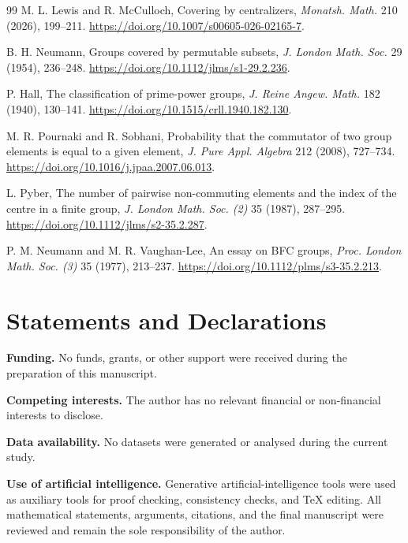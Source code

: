 \documentclass[11pt]{article}
\theoremstyle{definition}
\theoremstyle{remark}
\begin{document}
\begin{thebibliography}{99}
M. L. Lewis and R. McCulloch, Covering by centralizers, \emph{Monatsh. Math.} 210 (2026), 199--211. \url{https://doi.org/10.1007/s00605-026-02165-7}.

B. H. Neumann, Groups covered by permutable subsets, \emph{J. London Math. Soc.} 29 (1954), 236--248. \url{https://doi.org/10.1112/jlms/s1-29.2.236}.

P. Hall, The classification of prime-power groups, \emph{J. Reine Angew. Math.} 182 (1940), 130--141. \url{https://doi.org/10.1515/crll.1940.182.130}.

M. R. Pournaki and R. Sobhani, Probability that the commutator of two group elements is equal to a given element, \emph{J. Pure Appl. Algebra} 212 (2008), 727--734. \url{https://doi.org/10.1016/j.jpaa.2007.06.013}.

L. Pyber, The number of pairwise non-commuting elements and the index of the centre in a finite group, \emph{J. London Math. Soc. (2)} 35 (1987), 287--295. \url{https://doi.org/10.1112/jlms/s2-35.2.287}.

P. M. Neumann and M. R. Vaughan-Lee, An essay on BFC groups, \emph{Proc. London Math. Soc. (3)} 35 (1977), 213--237. \url{https://doi.org/10.1112/plms/s3-35.2.213}.

\end{thebibliography}

\section*{Statements and Declarations}

\noindent\textbf{Funding.} No funds, grants, or other support were received during the preparation of this manuscript.

\medskip
\noindent\textbf{Competing interests.} The author has no relevant financial or non-financial interests to disclose.

\medskip
\noindent\textbf{Data availability.} No datasets were generated or analysed during the current study.

\medskip
\noindent\textbf{Use of artificial intelligence.} Generative artificial-intelligence tools were used as auxiliary tools for proof checking, consistency checks, and \TeX{} editing. All mathematical statements, arguments, citations, and the final manuscript were reviewed and remain the sole responsibility of the author.
\end{document}
